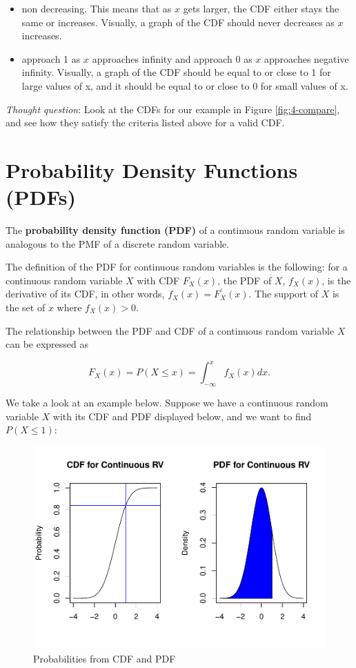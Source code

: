 \documentclass[
]{book}
\providecommand{\tightlist}{%
  \setlength{\itemsep}{0pt}\setlength{\parskip}{0pt}}
\begin{document}
\begin{itemize}
\tightlist
\item
  non decreasing. This means that as \(x\) gets larger, the CDF either stays the same or increases. Visually, a graph of the CDF should never decreases as \(x\) increases.
\item
  approach 1 as \(x\) approaches infinity and approach 0 as \(x\) approaches negative infinity. Visually, a graph of the CDF should be equal to or close to 1 for large values of x, and it should be equal to or close to 0 for small values of x.
\end{itemize}

\emph{Thought question}: Look at the CDFs for our example in Figure \ref{fig:4-compare}, and see how they satisfy the criteria listed above for a valid CDF.

\section{Probability Density Functions (PDFs)}\label{probability-density-functions-pdfs}

The \textbf{probability density function (PDF)} of a continuous random variable is analogous to the PMF of a discrete random variable.

The definition of the PDF for continuous random variables is the following: for a continuous random variable \(X\) with CDF \(F_X(x)\), the PDF of \(X\), \(f_X(x)\), is the derivative of its CDF, in other words, \(f_X(x) = F_X^{\prime}(x)\). The support of \(X\) is the set of \(x\) where \(f_X(x) >0\).

The relationship between the PDF and CDF of a continuous random variable \(X\) can be expressed as

\begin{equation} 
F_X(x) = P(X \leq x) = \int_{-\infty}^{x} f_X(x) dx.
\label{eq:4-PDFCDF}
\end{equation}

We take a look at an example below. Suppose we have a continuous random variable \(X\) with its CDF and PDF displayed below, and we want to find \(P(X \leq 1)\):

\begin{figure}
\centering
\includegraphics{bookdown-demo_files/figure-latex/4-prob-1.pdf}
\caption{\label{fig:4-prob}Probabilities from CDF and PDF}
\end{figure}
\end{document}
